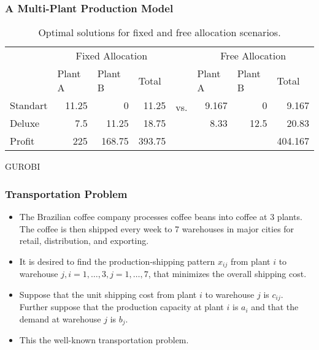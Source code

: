 \documentclass[11pt]{beamer}
\begin{document}
\begin{frame}
\frametitle{A Multi-Plant Production Model}
\begin{table}[htbp]
  \centering
  \caption{Optimal solutions for fixed and free allocation scenarios.}
    \begin{tabular}{lrrrcrrr}
    & \multicolumn{3}{c}{Fixed Allocation} & &\multicolumn{3}{c}{Free Allocation}  \\
          & \multicolumn{1}{l}{Plant A} & \multicolumn{1}{l}{Plant B} & \multicolumn{1}{l}{Total} & \multirow{4}[0]{*}{vs.} & \multicolumn{1}{l}{Plant A} & \multicolumn{1}{l}{Plant B} & \multicolumn{1}{l}{Total} \\
    Standart & 11.25 & 0     & 11.25 &       & 9.167 & 0     & 9.167 \\
    Deluxe & 7.5   & 11.25 & 18.75 &       & 8.33  & 12.5  & 20.83 \\
    Profit & 225   & 168.75 & 393.75 &       &       &       & 404.167 \\
    \end{tabular}%
\end{table}%

\end{frame}
\begin{frame}{GUROBI}

\end{frame}
\begin{frame}
\frametitle{Transportation Problem}
\begin{itemize}
\item The Brazilian coffee company processes coffee beans into coffee at 3 plants. The coffee is then shipped every week to 7 warehouses in major cities for retail, distribution, and exporting.
\item It is desired to find the production-shipping pattern $x_{ij}$ from plant $i$ to warehouse $j, i = 1,\ldots ,3, j = 1,\ldots,7$, that minimizes the overall shipping cost.
\item Suppose that the unit shipping cost from plant $i$ to warehouse $j$ is $c_{ij}$. Further suppose that the production capacity at plant $i$ is $a_i$ and that the demand at warehouse $j$ is $b_j$.
\item  This the well-known transportation problem.
\end{itemize}

\end{frame}
\end{document}
